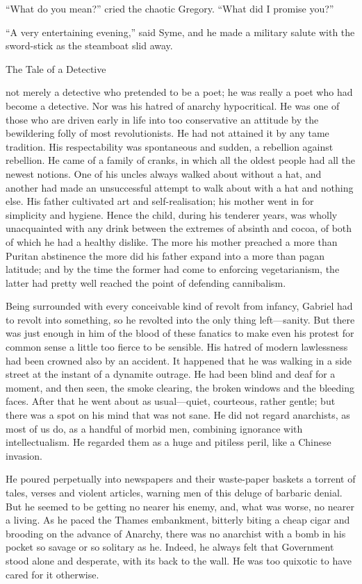 “What do you mean?” cried the chaotic Gregory. “What did I promise you?”

“A very entertaining evening,” said Syme, and he made a military salute with the sword-stick as the steamboat slid away.

\chap The Tale of a Detective

 not merely a detective who pretended to be a poet; he was really a poet who had become a detective. Nor was his hatred of anarchy hypocritical. He was one of those who are driven early in life into too conservative an attitude by the bewildering folly of most revolutionists. He had not attained it by any tame tradition. His respectability was spontaneous and sudden, a rebellion against rebellion. He came of a family of cranks, in which all the oldest people had all the newest notions. One of his uncles always walked about without a hat, and another had made an unsuccessful attempt to walk about with a hat and nothing else. His father cultivated art and self-realisation; his mother went in for simplicity and hygiene. Hence the child, during his tenderer years, was wholly unacquainted with any drink between the extremes of absinth and cocoa, of both of which he had a healthy dislike. The more his mother preached a more than Puritan abstinence the more did his father expand into a more than pagan latitude; and by the time the former had come to enforcing vegetarianism, the latter had pretty well reached the point of defending cannibalism.

Being surrounded with every conceivable kind of revolt from infancy, Gabriel had to revolt into something, so he revolted into the only thing left⁠—sanity. But there was just enough in him of the blood of these fanatics to make even his protest for common sense a little too fierce to be sensible. His hatred of modern lawlessness had been crowned also by an accident. It happened that he was walking in a side street at the instant of a dynamite outrage. He had been blind and deaf for a moment, and then seen, the smoke clearing, the broken windows and the bleeding faces. After that he went about as usual⁠—quiet, courteous, rather gentle; but there was a spot on his mind that was not sane. He did not regard anarchists, as most of us do, as a handful of morbid men, combining ignorance with intellectualism. He regarded them as a huge and pitiless peril, like a Chinese invasion.

He poured perpetually into newspapers and their waste-paper baskets a torrent of tales, verses and violent articles, warning men of this deluge of barbaric denial. But he seemed to be getting no nearer his enemy, and, what was worse, no nearer a living. As he paced the Thames embankment, bitterly biting a cheap cigar and brooding on the advance of Anarchy, there was no anarchist with a bomb in his pocket so savage or so solitary as he. Indeed, he always felt that Government stood alone and desperate, with its back to the wall. He was too quixotic to have cared for it otherwise.

